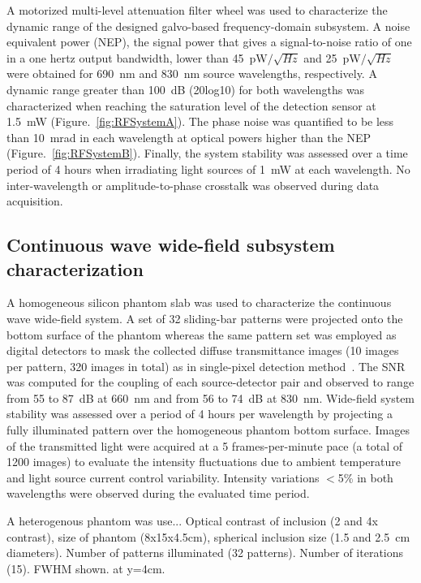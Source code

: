 A motorized multi-level attenuation filter wheel was used to characterize the dynamic range of the designed galvo-based frequency-domain subsystem. A noise equivalent power (NEP), the signal power that gives a signal-to-noise ratio of one in a one hertz output bandwidth, lower than 45~pW$/\sqrt{Hz}$ and 25~pW$/\sqrt{Hz}$ were obtained for 690~nm and 830~nm source wavelengths, respectively. A dynamic range greater than 100~dB (20log10) for both wavelengths was characterized when reaching the saturation level of the detection sensor at 1.5~mW (Figure.~\ref{fig:RFSystemA}). The phase noise was quantified to be less than 10~mrad in each wavelength at optical powers higher than the NEP (Figure.~\ref{fig:RFSystemB}). Finally, the system stability was assessed over a time period of 4 hours when irradiating light sources of 1~mW at each wavelength. No inter-wavelength or amplitude-to-phase crosstalk was observed during data acquisition.


\subsection{Continuous wave wide-field subsystem characterization}
A homogeneous silicon phantom slab was used to characterize the continuous wave wide-field system. A set of 32 sliding-bar patterns were projected onto the bottom surface of the phantom whereas the same pattern set was employed as digital detectors to mask the collected diffuse transmittance images (10 images per pattern, 320 images in total) as in single-pixel detection method~\cite{Pian2015}. The SNR was computed for the coupling of each source-detector pair and observed to range from 55 to 87~dB at 660~nm and from 56 to 74~dB at 830~nm. Wide-field system stability was assessed over a period of 4 hours per wavelength by projecting a fully illuminated pattern over the homogeneous phantom bottom surface. Images of the transmitted light were acquired at a 5 frames-per-minute pace (a total of 1200 images) to evaluate the intensity fluctuations due to ambient temperature and light source current control variability. Intensity variations $<$5\% in both wavelengths were observed during the evaluated time period.

A heterogenous phantom was use...
Optical contrast of inclusion (2 and 4x contrast), size of phantom (8x15x4.5cm), spherical inclusion size (1.5 and 2.5~cm diameters).
Number of patterns illuminated (32 patterns). 
Number of iterations (15).
FWHM shown. at y=4cm.



